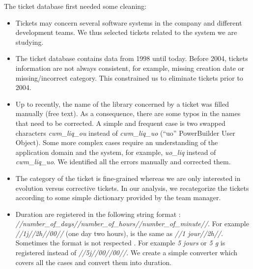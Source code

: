 \documentclass[10pt,conference]{IEEEtran}
\begin{document}
The ticket database first needed some cleaning:
\begin{itemize}
  \item Tickets may concern several software systems in the company and different development teams.
  We thus selected tickets related to the system we are studying.
  
  \item The ticket database contains data from 1998  until today. 
  Before 2004, tickets information are not always consistent, for example, missing creation date or missing/incorrect category.
  This constrained us to eliminate tickets prior to 2004.

  \item Up to recently, the name of the library concerned by a ticket was filled manually (free text).
  As a consequence, there are some typos in the names that need to be corrected.
  A simple and frequent case is two swapped characters \emph{cwm\_liq\_ou} instead of \emph{cwm\_liq\_uo} (``uo'' PowerBuilder User Object).
  Some more complex cases require an understanding of the application domain and the system, for example, \emph{uo\_liq} instead of \emph{cwm\_liq\_uo}.
  We identified all the errors manually and corrected them.
  
  \item The category of the ticket is fine-grained whereas we are only interested in evolution versus corrective tickets.
  In our analysis, we recategorize the tickets according to some simple dictionary provided by the team manager.
  \item Duration are registered in the following string format : \emph{//number\_of\_days//number\_of\_hours//number\_of\_minute//}.
   For example \emph{//1j//2h//00//}  (one day two hours), is the same as \emph{//1 jour//2h//}.
  Sometimes the format is not respected . For example \emph{5 jours } or \emph{5 g} is registered instead of \emph{//5j//00//00//}.
  We create a simple  converter which covers all the cases and convert them into duration.
  
\end{itemize}
 
\end{document}
